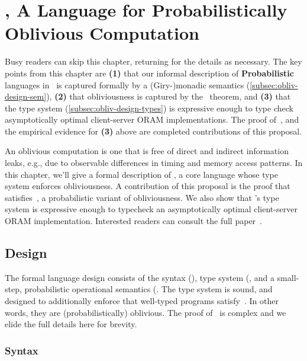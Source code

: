 \chapter{\obliv, A Language for Probabilistically Oblivious Computation}
\label{ch:obliv}

Busy readers can skip this chapter, returning for the details as necessary. The key points from this chapter are \textbf{(1)}
that our informal description of \textbf{Probabilistic} languages in~ is captured formally by a (Giry-)monadic semantics
(\ref{subsec:obliv-design-sem}), \textbf{(2)} that obliviousness is captured by the~ theorem, and \textbf{(3)} that
the type system (\ref{subsec:obliv-design-types}) is expressive enough to type check asymptotically optimal client-server ORAM implementations.
The proof of~, and the empirical evidence for \textbf{(3)} above are completed contributions of this proposal.

An oblivious computation is one that is free of direct and indirect information leaks, e.g., due to observable differences
in timing and memory access patterns. In this chapter, we'll give a formal description of \obliv, a core language whose
type system enforces obliviousness. A contribution of this proposal is the proof that \obliv satisfies~,
a probabilistic variant of obliviousness. We also show that \obliv's type system is expressive enough to typecheck an asymptotically
optimal client-server ORAM implementation. Interested readers can consult the full paper~\cite{darais20obliv}.

\section{Design}
\label{sec:obliv-design}

The formal language design consists of the syntax (), type system (,
and a small-step, probabilistic operational semantics (. The type system is sound, and designed to additionally
enforce that well-typed programs satisfy~. In other words, they are (probabilistically) oblivious.
The proof of~ is complex and we elide the full details here for brevity.


\subsection{Syntax}
\label{subsec:obliv-design-syntax}

